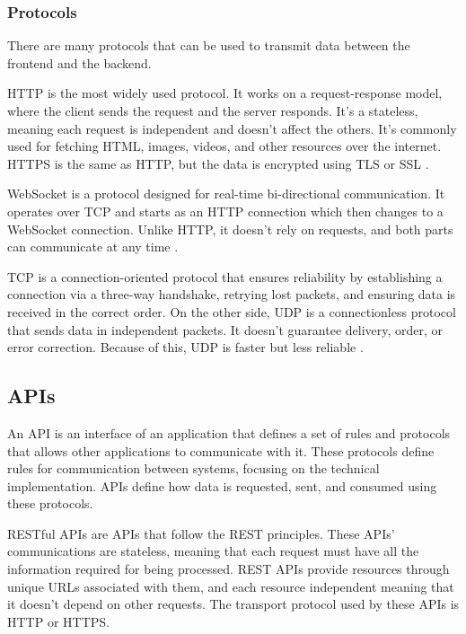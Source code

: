 \subsubsection{Protocols}
There are many protocols that can be used to transmit data between the frontend
and the backend.

\gls{HTTP} is the most widely used protocol. It works on a
request-response model, where the client sends the request and the server
responds. It's a stateless, meaning each request is independent and doesn't
affect the others. It's commonly used for fetching \gls{HTML}, images, videos,
and other resources over the internet. \gls{HTTPS} is the same as \gls{HTTP}, but the
data is encrypted using \gls{TLS} or \gls{SSL} \cite{CloudflareHTTP, CloudflareHTTPS}.

WebSocket is a protocol designed for real-time bi-directional communication.
It operates over \gls{TCP} and starts as an \gls{HTTP} connection which then changes to a
WebSocket connection. Unlike \gls{HTTP}, it doesn't rely on requests, and both
parts can communicate at any time \cite{WebsocketRFC}.

\gls{TCP} is a connection-oriented protocol that ensures reliability by
establishing a connection via a three-way handshake, retrying lost
packets, and ensuring data is received in the correct order.
On the other side, \gls{UDP} is a connectionless protocol that sends data in
independent packets. It doesn't guarantee delivery, order, or error
correction. Because of this, \gls{UDP} is faster but less reliable \cite{al2018performance}.

\subsection{APIs}
An \gls{API} is an interface of an application that defines a set of rules and
protocols that allows other applications to communicate with it.
These protocols define rules for communication between systems, focusing on the
technical implementation. \gls{API}s define how data is requested, sent, and
consumed using these protocols.

\gls{REST}ful \gls{API}s are \gls{API}s that follow the \gls{REST} principles.
These \gls{API}s' communications are stateless, meaning that each request must
have all the information required for being processed.
\gls{REST} \gls{API}s provide resources through unique \gls{URL}s associated with them, and
each resource independent meaning that it doesn't depend on other
requests. The transport protocol used by these \gls{API}s is \gls{HTTP} or \gls{HTTPS}\cite {9101226}.

